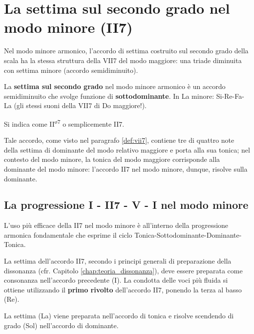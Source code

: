 \section{La settima sul secondo grado nel modo minore (II7)}
\label{sec:ii7_minore}

Nel modo minore armonico, l'accordo di settima costruito sul secondo grado della scala ha la stessa struttura della VII7 del modo maggiore: una triade diminuita con settima minore (accordo semidiminuito).

\begin{definizione}
	\label{def:ii7_minore}
	La \textbf{settima sul secondo grado} nel modo minore armonico è un accordo semidiminuito che svolge funzione di \textbf{sottodominante}. In La minore: Si-Re-Fa-La (gli stessi suoni della VII7 di Do maggiore!).
	
	Si indica come II\textsuperscript{\o 7} o semplicemente II7.
\end{definizione}

Tale accordo, come visto nel paragrafo \ref{def:vii7}, contiene tre di quattro note della settima di dominante del modo relativo maggiore e porta alla sua tonica; nel contesto del modo minore, la tonica del modo maggiore corrisponde alla dominante del modo minore: l'accordo II7 nel modo minore, dunque, risolve sulla dominante.

\subsection{La progressione I - II7 - V - I nel modo minore}
\label{subsec:progressione_ii7}

L'uso più efficace della II7 nel modo minore è all'interno della progressione armonica fondamentale che esprime il ciclo Tonica-Sottodominante-Dominante-Tonica.

\begin{regola}
	\label{reg:preparazione_ii7}
	La settima dell'accordo II7, secondo i principi generali di preparazione della dissonanza (cfr. Capitolo \ref{chap:teoria_dissonanza}), deve essere preparata come consonanza nell'accordo precedente (I). La condotta delle voci più fluida si ottiene utilizzando il \textbf{primo rivolto} dell'accordo II7, ponendo la terza al basso (Re).
\end{regola}

\begin{esempio}
	\label{ex:progressione_ii7_minore}
	La settima (La) viene preparata nell'accordo di tonica e risolve scendendo di grado (Sol) nell'accordo di dominante.
\end{esempio}

